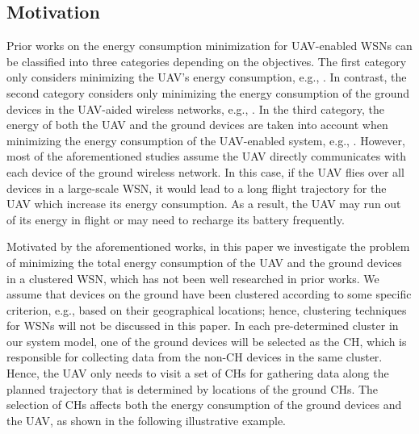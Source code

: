 \documentclass[journal]{IEEEtran}
\begin{document}
	\subsection{Motivation}
	Prior works on the energy consumption minimization for UAV-enabled WSNs can be classified into three categories depending on the objectives. The first category only considers minimizing the UAV's energy consumption, e.g., \cite{Q. Song, Y. Zeng}. In contrast, the second category considers only minimizing the energy consumption of the ground devices in the UAV-aided wireless networks, e.g., \cite{C. Zhan and H. Lai, J. Baek}. In the third category, the energy of both the UAV and the ground devices are taken into account when minimizing the energy consumption of the UAV-enabled system, e.g., \cite{M. B. Ghorbel, D. Yang}. However, most of the aforementioned studies assume the UAV directly communicates with each device of the ground wireless network. In this case, if the UAV flies over all devices in a large-scale WSN, it would lead to a long flight trajectory for the UAV which increase its energy consumption. As a result, the UAV may run out of its energy in flight or may need to recharge its battery frequently.
	
	Motivated by the aforementioned works, in this paper we investigate the problem of minimizing the total energy consumption of the UAV and the ground devices in a clustered WSN, which has not been well researched in prior works. We assume that devices on the  ground have been clustered according to some specific criterion, e.g., based on their geographical locations; hence, clustering techniques for WSNs will not be discussed in this paper. In each pre-determined cluster in our system model, one of the ground devices will be selected as the CH, which is responsible for collecting data from the non-CH devices in the same cluster. Hence, the UAV only needs to visit a set of CHs for gathering data along the planned trajectory that is determined by locations of the ground CHs. The selection of CHs affects both the energy consumption of the ground devices and the UAV, as shown in the following illustrative example. 
\end{document}
